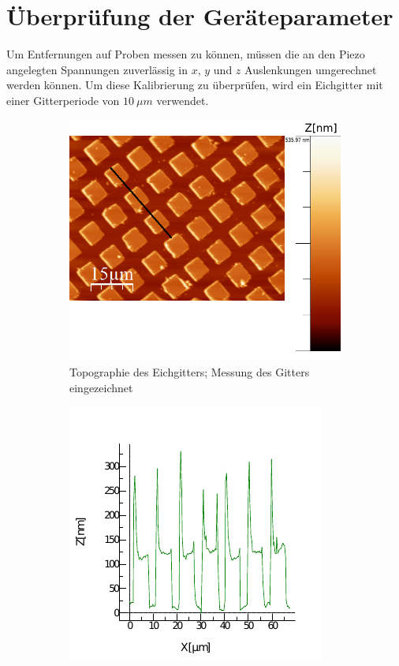     \section{Überprüfung der Geräteparameter}

Um Entfernungen auf Proben messen zu können, müssen die an den Piezo angelegten 
Spannungen zuverlässig in $x$, $y$ und $z$ Auslenkungen umgerechnet werden können.
Um diese Kalibrierung zu überprüfen, wird ein Eichgitter mit einer Gitterperiode
von  $\SI{10}{\mu m}$ verwendet.
\begin{figure}
    \centering
    \begin{subfigure}[hb]{0.4\textwidth}
        \includegraphics[width=\textwidth]{Mess/gitter_paint.png}
        \caption{Topographie des Eichgitters; Messung des Gitters eingezeichnet}
        \label{gitter}
    \end{subfigure}
    \begin{subfigure}[hb]{0.4\textwidth}
        \includegraphics[width=\textwidth]{Mess/profil_gitter.pdf}

\end{subfigure}
\end{figure}
